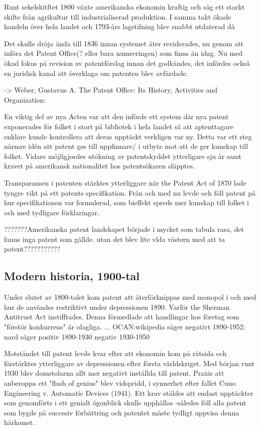 Runt sekelskitftet 1800 växte amerikanska ekonomin kraftig och såg ett starkt skifte från agrikultur till industrialiserad produktion. I samma takt ökade handeln över hela landet och 1793-års lagstifning blev snabbt utdaterad då

 Det skulle dröja ända till 1836 innan systemet åter reviderades, nu genom att införa det Patent Office(? eller bara numreringen) som finns än idag. Nu med ökad fokus på revision av patentförslag innan det godkändes, det infördes också en juridisk kanal att överklaga om patenten blev avfärdade. 

-> Weber, Gustavus A. The Patent Office: Its History, Activities and Organization:

En viktig del av nya Acten var att den införde ett system där nya patent exponerades för folket i stort på bibliotek i hela landet så att aptenttagare enklare kunde kontrollera att deras upptäckt verkligen var ny.  Detta var ett steg närmre idén att patent ges till uppfinnare/ i utbyte mot att de ger kunskap till folket. Vidare möjligjordes utökning av patentskyddet ytterligare sju år samt kravet på amerikansk nationalitet hos patentsökaren släpptes.

Transparansen i patenten stärktes ytterliggare när the Patent Act of 1870 lade tyngre vikt på ett patents specifikation. Från och med nu levde och föll patent på hur specifikationen var formulerad, som bieffekt spreds mer kunskap till folket i och med tydligare förklaringar.


???????Amerikanska patent landskapet började i mycket som tabula rasa, det fanns inga patent som gällde. utan det blev lite vlda västern med att ta patent???????????





\subsection{Modern historia, 1900-tal} %
\label{sub:modern_historia_1900_tal}

Under slutet av 1800-talet kom patent att återförknippas med monopol i och med hur de användes restriktivt under depressionen 1890. Varför the Sherman Antitrust Act instifftades. Denna förmedlade att handlingar hos företag som "förstör konkurrens" är olagliga. ...
OCAN:wikipedia säger negativt 1890-1952; nard säger positiv 1890-1930 negativ 1930-1950

Motståndet till patent levde kvar efter att ekonomin kom på rätsida och förstärktes ytterliggare av depressionen efter första världskriget. Med början runt 1930 blev domstolarna allt mer negativt inställda till patent. Praxis att anberoppa ett "flash of genius" blev vidspridd, i synnerhet efter fallet Cuno Engineering v. Automatic Devices (1941). Ett krav stäldes att endast upptäckter som genomförts i ett genialt ögonblick skulle upphållas -således föll alla patent som bygde på succesiv förbättring och patentet måste tydligt uppvisa denna härkomst. 

